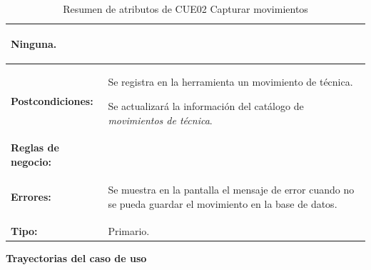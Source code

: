 \begin{table}[H]
\begin{tabular}{| l | p{12 cm} |}
\begin{compactitem}
								\item Ninguna.
							\end{compactitem}\\
\hline
\textbf{Postcondiciones:} & \vspace{-2mm}	%
							\begin{compactitem}
								\setlength\itemsep{-0.25em}
								\item Se registra en la herramienta un movimiento de técnica.
								\item Se actualizará la información del catálogo de \textit{movimientos de técnica}.
							\end{compactitem}\\
							
\hline
\textbf{Reglas de negocio:} & \vspace{-2mm}	%
							\begin{compactitem}
								\setlength\itemsep{-0.25em}
								\item \nameref{rn:RNR34}
								\item \nameref{rn:RNR35}
								\item \nameref{rn:RNR36}
								\item \nameref{rn:RNR37}
								\item \nameref{rn:RNR38}
							\end{compactitem}\\							
\hline
\textbf{Errores:} &	\vspace{-2mm}	%
					\begin{compactitem}
						\setlength\itemsep{-0.25em}
						\item Se muestra en la pantalla \nameref{pant:IUE02} el mensaje de error \nameref{msj:MSG25} cuando no se pueda guardar el movimiento en la base de datos.
					\end{compactitem}\\
\hline
\textbf{Tipo:} & Primario.\\
\hline	
\end{tabular}
\caption{Resumen de atributos de CUE02 Capturar movimientos}
\label{tab:CUE02}
\end{table} 
\clearpage

\textbf{\textcolor[rgb]{0, 0, 0.545098}{Trayectorias del caso de uso}} \\

